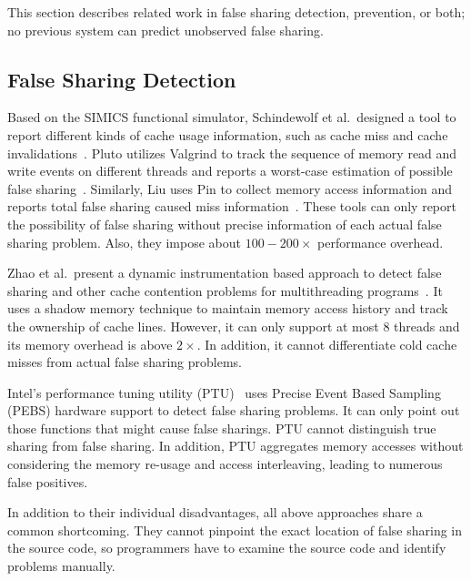 \label{sec:relatedwork}

This section describes related work in false sharing detection, prevention, or both; no previous
system can predict unobserved false sharing.

\subsection{False Sharing Detection}
Based on the SIMICS functional simulator, Schindewolf et al.\ designed a tool 
to report different kinds of cache usage information,
such as cache miss and cache invalidations~\cite{falseshare:simulator}.
Pluto utilizes Valgrind to track the sequence of memory read and write
events on different threads and reports a worst-case estimation of
possible false sharing~\cite{falseshare:binaryinstrumentation1}.
Similarly, Liu uses Pin to collect memory access information and
reports total false sharing caused miss information~\cite{falseshare:binaryinstrumentation2}.
These tools can only report the possibility of false sharing without precise information of each
actual false sharing problem.  
Also, they impose about $100-200\times$ performance overhead.

Zhao et al.\ present a dynamic instrumentation based approach to 
detect false sharing and other cache contention problems
for multithreading programs~\cite{qinzhaodetection}. 
It uses a shadow memory technique to maintain memory access history and track the ownership of 
cache lines. 
However, it can only support at most $8$ threads and its memory overhead 
is above $2\times$. In addition, it cannot differentiate cold cache misses from 
actual false sharing problems.

Intel's performance tuning utility (PTU)~\cite{detect:ptu,
detect:intel} uses Precise Event Based Sampling (PEBS) hardware
support to detect false sharing problems.  It can only point out those
functions that might cause false sharings.  PTU cannot distinguish
true sharing from false sharing. In addition, PTU aggregates memory
accesses without considering the memory re-usage and access
interleaving, leading to numerous false positives.

In addition to their individual disadvantages,
all above approaches share a common shortcoming. 
They cannot pinpoint the exact location of false sharing in the source code, 
so programmers have to examine the source code and identify problems manually.

